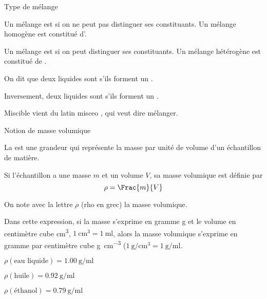 \begin{doc}{Type de mélange}
  \label{doc:type_melange}
  \begin{encart}
    Un mélange est  si on ne peut pas distinguer ses constituants.
    Un mélange homogène est constitué d'.
  \end{encart}
  
  \begin{encart}
    Un mélange est  si on peut distinguer ses constituants.
    Un mélange hétérogène est constitué de .
  \end{encart}

  \begin{encart}
    On dit que deux liquides sont  s'ils forment un .
  \end{encart}
  \begin{encart}
    Inversement, deux liquides sont  s'ils forment un .
  \end{encart}
  Miscible vient du latin \og misceo \fg, qui veut dire mélanger.
\end{doc}

\begin{doc}{Notion de masse volumique}
  \label{doc:masse_volumique}
  \vspace*{-20pt}
  \begin{encart}
    La  est une grandeur qui représente la masse par unité de volume d'un échantillon de matière.
  \end{encart}

  \begin{encart}
    Si l'échantillon a une masse $m$ et un volume $V$, sa masse volumique est définie par
    \begin{equation*}
      \rho = \Frac{m}{V}
    \end{equation*}
  \end{encart}
  \attention On note avec la lettre $\rho$ (\og rho \fg en grec) la masse volumique.

  Dans cette expression, si la masse s'exprime en gramme \unit{\g}
  et le volume en centimètre cube \unit{\cm\cubed}, $\qty{1}{\cm\cubed} = \qty{1}{\ml}$,
  alors la masse volumique s'exprime en gramme par centimètre cube \unit{\g\per\cm\cubed}
  ($\qty{1}{\g\per\cm\cubed} = \qty{1}{\g\per\ml}$.

  \begin{donnees}
    \item $\rho (\text{eau liquide}) = \qty{1,00}{\g\per\ml}$
    \item $\rho (\text{huile}) = \qty{0,92}{\g\per\ml}$
    \item $\rho (\text{éthanol}) = \qty{0,79}{\g\per\ml}$
  \end{donnees}
\end{doc}


